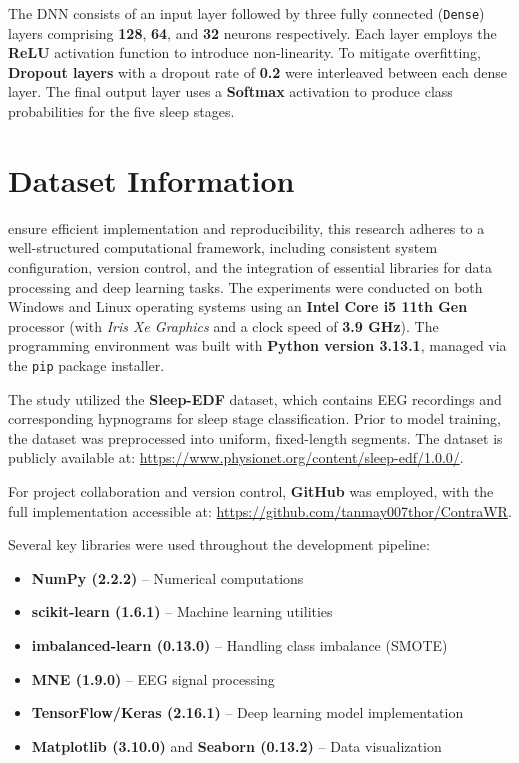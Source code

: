The DNN consists of an input layer followed by three fully connected (\texttt{Dense}) layers comprising \textbf{128}, \textbf{64}, and \textbf{32} neurons respectively. Each layer employs the \textbf{ReLU} activation function to introduce non-linearity. To mitigate overfitting, \textbf{Dropout layers} with a dropout rate of \textbf{0.2} were interleaved between each dense layer. The final output layer uses a \textbf{Softmax} activation to produce class probabilities for the five sleep stages.




\section{Dataset Information}


ensure efficient implementation and reproducibility, this research adheres to a well-structured computational framework, including consistent system configuration, version control, and the integration of essential libraries for data processing and deep learning tasks. The experiments were conducted on both Windows and Linux operating systems using an \textbf{Intel Core i5 11th Gen} processor (with \textit{Iris Xe Graphics} and a clock speed of \textbf{3.9 GHz}). The programming environment was built with \textbf{Python version 3.13.1}, managed via the \texttt{pip} package installer.

The study utilized the \textbf{Sleep-EDF} dataset, which contains EEG recordings and corresponding hypnograms for sleep stage classification. Prior to model training, the dataset was preprocessed into uniform, fixed-length segments. The dataset is publicly available at: \url{https://www.physionet.org/content/sleep-edf/1.0.0/}.

For project collaboration and version control, \textbf{GitHub} was employed, with the full implementation accessible at: \url{https://github.com/tanmay007thor/ContraWR}.

Several key libraries were used throughout the development pipeline:
\begin{itemize}
	\item \textbf{NumPy (2.2.2)} – Numerical computations
	\item \textbf{scikit-learn (1.6.1)} – Machine learning utilities
	\item \textbf{imbalanced-learn (0.13.0)} – Handling class imbalance (SMOTE)
	\item \textbf{MNE (1.9.0)} – EEG signal processing
	\item \textbf{TensorFlow/Keras (2.16.1)} – Deep learning model implementation
	\item \textbf{Matplotlib (3.10.0)} and \textbf{Seaborn (0.13.2)} – Data visualization
\end{itemize}

